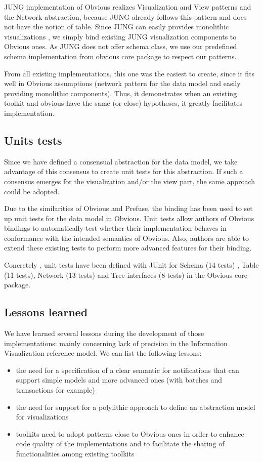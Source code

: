JUNG implementation of Obvious realizes Visualization and View patterns and the Network abstraction, because JUNG already follows this pattern and does not have the notion of table. Since JUNG can easily provides monolithic visualizations , we simply bind existing JUNG visualization components to Obvious ones. As JUNG does not offer schema class, we use our predefined schema implementation from obvious core package to respect our patterns.

From all existing implementations, this one was the easiest to create, since it fits well in Obvious assumptions (network pattern for the data model and easily providing monolithic components). Thus, it demonstrates when an existing toolkit and obvious have the same (or close)  hypotheses, it greatly facilitates implementation.

\subsection{Units tests}

Since we have defined a consensual abstraction for the data model, we take advantage of this consensus to create unit tests for this abstraction. If such a consensus emerges for the visualization and/or the view part, the same approach could be adopted.

Due to the similarities of Obvious and Prefuse, the binding has been used to set up unit tests for the data model in Obvious. Unit tests allow authors of Obvious bindings to automatically test whether their implementation behaves in conformance with the intended semantics of Obvious. Also, authors are able to extend these existing tests to perform more advanced features for their binding.

Concretely , unit tests have been defined with JUnit  for Schema (14 tests) , Table (11 tests), Network (13 tests) and Tree interfaces (8 tests) in the Obvious core package.

\subsection{Lessons learned}

We have learned several lessons during the development of those implementations: mainly concerning lack of precision in the Information Visualization reference model. We can list the following lessons:

\begin{itemize}
\item the need for a specification of a clear semantic for notifications that can support simple models and more advanced ones (with batches and transactions for example)
\item the need for support for a polylithic approach to define an abstraction model for visualizations
\item toolkits need to adopt patterns close to Obvious ones in order to enhance code quality of the implementations and to facilitate the sharing of functionalities among existing toolkits
\end{itemize}

